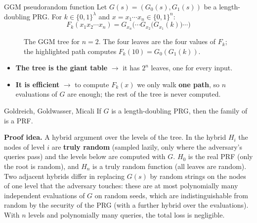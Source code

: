 \begin{frameddefn}[label={def:ggm}]{GGM pseudorandom function}
  Let $G(s) = (G_0(s), G_1(s))$ be a length-doubling PRG. For $k \in \{0,1\}^\lambda$ and $x = x_1 \cdots x_n \in \{0,1\}^n$:
  \[
    F_k(x_1 x_2 \cdots x_n) = G_{x_n}\Big(\cdots G_{x_2}\big(G_{x_1}(k)\big)\cdots\Big)
  \]
\end{frameddefn}

\begin{figure}[H]
  \centering
  \caption{The GGM tree for $n = 2$. The four leaves are the four values of $F_k$; the highlighted path computes $F_k(10) = G_0(G_1(k))$.}
\end{figure}

\begin{itemize}
  \item \textbf{The tree is the giant table} $\to$ it has $2^n$ leaves, one for every input.
  \item \textbf{It is efficient} $\to$ to compute $F_k(x)$ we only walk \textbf{one path}, so $n$ evaluations of $G$ are enough; the rest of the tree is never computed.
\end{itemize}

\begin{framedthm}[label={thm:ggm}]{Goldreich, Goldwasser, Micali}
  If $G$ is a length-doubling PRG, then the family of  is a PRF.
\end{framedthm}

\textbf{Proof idea.} A hybrid argument over the levels of the tree. In the hybrid $H_i$ the nodes of level $i$ are \textbf{truly random} (sampled lazily, only where the adversary's queries pass) and the levels below are computed with $G$. $H_0$ is the real PRF (only the root is random), and $H_n$ is a truly random function (all leaves are random). Two adjacent hybrids differ in replacing $G(s)$ by random strings on the nodes of one level that the adversary touches: these are at most polynomially many independent evaluations of $G$ on random seeds, which are indistinguishable from random by the security of the PRG (with a further hybrid over the evaluations). With $n$ levels and polynomially many queries, the total loss is negligible.


